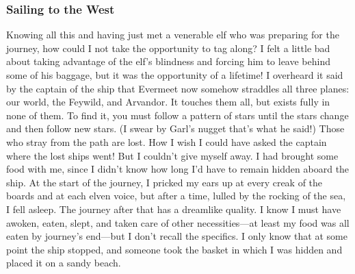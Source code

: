 \documentclass[10pt,a4paper,twoside,twocolumn,openany,bg=print,nodeprecatedcode]{dndbook}
\begin{document}
\subsubsection{Sailing to the West}
Knowing all this and having just met a venerable elf who was preparing for the journey, how could I not take the opportunity to tag along? I felt a little bad about taking advantage of the elf's blindness and forcing him to leave behind some of his baggage, but it was the opportunity of a lifetime!
I overheard it said by the captain of the ship that Evermeet now somehow straddles all three planes: our world, the Feywild, and Arvandor. It touches them all, but exists fully in none of them. To find it, you must follow a pattern of stars until the stars change and then follow new stars. (I swear by Garl's nugget that's what he said!) Those who stray from the path are lost. How I wish I could have asked the captain where the lost ships went! But I couldn't give myself away.
I had brought some food with me, since I didn't know how long I'd have to remain hidden aboard the ship. At the start of the journey, I pricked my ears up at every creak of the boards and at each elven voice, but after a time, lulled by the rocking of the sea, I fell asleep. The journey after that has a dreamlike quality. I know I must have awoken, eaten, slept, and taken care of other necessities—at least my food was all eaten by journey's end—but I don't recall the specifics. I only know that at some point the ship stopped, and someone took the basket in which I was hidden and placed it on a sandy beach.
\end{document}
